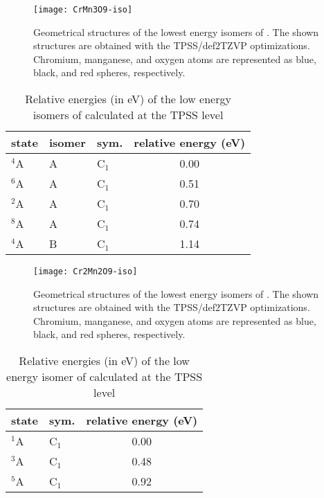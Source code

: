 \begin{figure}
	\centering
	\texttt{[image: CrMn3O9-iso]}
	\caption{Geometrical structures of the lowest energy isomers of . The shown structures are obtained with the TPSS/def2TZVP optimizations. Chromium, manganese, and oxygen atoms are represented as blue, black, and red spheres, respectively.}
	\label{figs:CrMn3O9}
\end{figure}






\begin{table}[]
	\centering
	\caption{Relative energies (in eV) of the low energy isomers of  calculated at the TPSS level}
	\begin{tabular}{@{}lllc@{}}
	\toprule
	   state & isomer & sym.    & relative energy (eV) \\ \midrule
	$^4$A    & A      & C$_1$   & 0.00                 \\
	$^6$A    & A      & C$_1$   & 0.51                 \\
	$^2$A    & A      & C$_1$   & 0.70                 \\
	$^8$A    & A      & C$_1$   & 0.74                 \\
	$^4$A    & B      & C$_1$   & 1.14                 \\ \bottomrule
	\end{tabular}
\end{table}


\begin{figure}
	\centering
	\texttt{[image: Cr2Mn2O9-iso]}
	\caption{Geometrical structures of the lowest energy isomers of . The shown structures are obtained with the TPSS/def2TZVP optimizations. Chromium, manganese, and oxygen atoms are represented as blue, black, and red spheres, respectively.}
	\label{figs:Cr2Mn2O9}
\end{figure}




\FloatBarrier



\begin{table}[]
	\centering
	\caption{Relative energies (in eV) of the low energy isomer of  calculated at the TPSS level}
	\begin{tabular}{@{}llc@{}}
	\toprule
	   state & sym. & relative energy (eV) \\ \midrule
	$^1$A    & C$_1$   & 0.00                 \\
	$^3$A    & C$_1$   & 0.48                 \\
	$^5$A    & C$_1$   & 0.92                 \\ \bottomrule
	\end{tabular}
\end{table}


